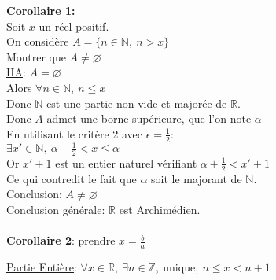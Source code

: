 \documentclass[12pt,twoside,a4paper]{article}
\begin{document}
		\begin{preuve}
			\textbf{Corollaire 1:}\\
			Soit $x$ un r\'eel positif.\\
			On consid\`ere $A=\{n\in\mathbb{N},\ n>x\}$\\
			Montrer que $A\neq\varnothing$\\
			\underline{HA}: $A=\varnothing$\\
			Alors $\forall n\in\mathbb{N},\ n\leqslant x$\\
			Donc $\mathbb{N}$ est une partie non vide et major\'ee de $\mathbb{R}$.\\
			Donc $A$ admet une borne sup\'erieure, que l'on note $\alpha$\\
			En utilisant le critère 2 avec $\epsilon=\frac{1}{2}$:\\
			$\exists x'\in\mathbb{N},\ \alpha-\frac{1}{2}<x\leqslant\alpha$\\
			Or $x'+1$ est un entier naturel v\'erifiant $\alpha+\frac{1}{2}<x'+1$\\
			Ce qui contredit le fait que $\alpha$ soit le majorant de $\mathbb{N}$.\\
			Conclusion: $A\neq\varnothing$\\
			Conclusion g\'en\'erale: $\mathbb{R}$ est Archim\'edien.\\
			\\
			\textbf{Corollaire 2}: prendre $x=\frac{b}{a}$
		\end{preuve}
		\begin{coro}
			\underline{Partie Entière}: $\forall x\in\mathbb{R},\ \exists n\in\mathbb{Z},\ \text{unique},\ n\leqslant x<n+1$
		\end{coro}
\end{document}
